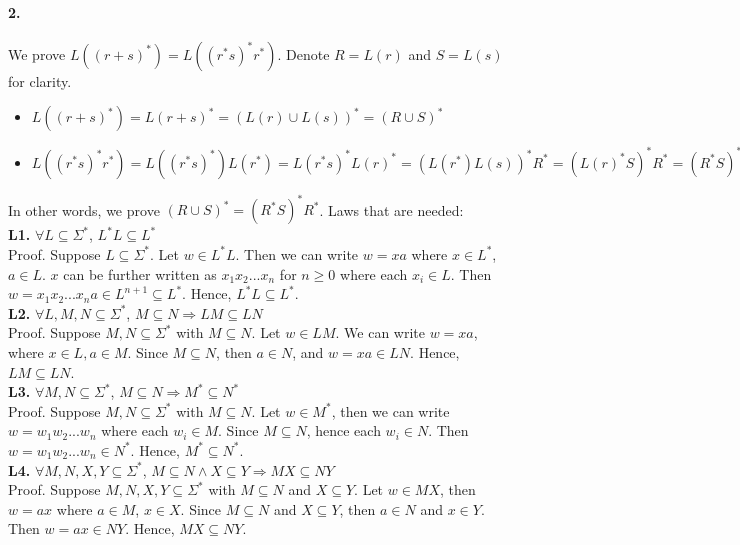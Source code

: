 \documentclass[12pt]{article}
\begin{document}
\paragraph*{2.} We prove \(L((r+s)^*) = L((r^*s)^*r^*)\). Denote \(R = L(r)\) and \(S = L(s)\) for clarity.
\begin{itemize}
  \item \(L((r+s)^*) = L(r+s)^* = (L(r) \cup L(s))^* = (R \cup S)^*\)
  \item \(L((r^*s)^*r^*) =  L((r^*s)^*)L(r^*) = L(r^*s)^*L(r)^* = (L(r^*)L(s))^*R^* = (L(r)^*S)^*R^* = (R^*S)^*R^*\)
\end{itemize}
In other words, we prove \((R \cup S)^* = (R^*S)^*R^*\). Laws that are needed:\\
\textbf{L1.} \(\forall L \subseteq \Sigma^*\), \(L^*L \subseteq L^*\)\\
Proof. Suppose \(L \subseteq \Sigma^*\). Let \(w \in L^*L\). Then we can write \(w = xa\) where \(x \in L^*\), \(a \in L\). \(x\) can be further written as \(x_1x_2...x_n\) for \(n \geq 0\) where each \(x_i \in L\). Then \(w = x_1x_2...x_na \in L^{n+1} \subseteq L^*\). Hence, \(L^*L \subseteq L^*\).\\
\textbf{L2.} \(\forall L, M, N \subseteq \Sigma^*\), \(M \subseteq N \Rightarrow LM \subseteq LN\)\\
Proof. Suppose \(M, N \subseteq \Sigma^*\) with \(M \subseteq N\). Let \(w \in LM\). We can write \(w = xa\), where \(x \in L, a \in M\). Since \(M \subseteq N\), then \(a \in N\), and \(w = xa \in LN\). Hence, \(LM 
\subseteq LN\).\\
\textbf{L3.} \(\forall M,N \subseteq \Sigma^*\), \(M \subseteq N \Rightarrow M^* \subseteq N^*\)\\
Proof. Suppose \(M,N \subseteq \Sigma^*\) with \(M \subseteq N\). Let \(w \in M^*\), then we can write \(w = w_1w_2...w_n\) where each \(w_i \in M\). Since \(M \subseteq N\), hence each \(w_i \in N\). Then \(w = w_1w_2...w_n \in N^*\). Hence, \(M^* \subseteq N^*\).\\
\textbf{L4.} \(\forall M,N,X,Y \subseteq \Sigma^*\), \(M \subseteq N \land X \subseteq Y \Rightarrow MX \subseteq NY\)\\
Proof. Suppose \(M,N,X,Y \subseteq \Sigma^*\) with \(M \subseteq N\) and \(X \subseteq Y\). Let \(w \in MX\), then \(w = ax\) where \(a \in M\), \(x \in X\). Since \(M \subseteq N\) and \(X \subseteq Y\), then \(a \in N\) and \(x \in Y\). Then \(w = ax \in NY\). Hence, \(MX \subseteq NY\).
\end{document}
